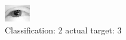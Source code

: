 \begin{figure}[h!]
\begin{center}
\includegraphics[width=0.60\columnwidth]{figures/ID2397_class_2_target_3.png}
\end{center}
\caption{ Classification: 2 actual target: 3}
\label{fig:ID2397_class_2_target_3}
\end{figure}
